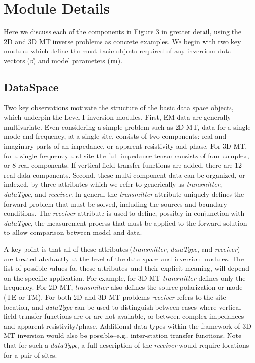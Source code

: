 \section{Module Details}

Here we discuss each of the components in Figure 3 in greater detail,
using the 2D and 3D MT inverse problems as concrete
examples.  We begin with two key modules which
define the most basic objects required of any inversion:
data vectors ($\dd$) and model parameters (${\bf m}$).

\subsection{DataSpace}

Two key observations motivate the structure of the basic
data space objects, which underpin the Level I inversion modules. 
First, EM data are generally multivariate.  
Even considering a simple problem such as 2D MT,
data for a single mode and frequency, at a single site, consists
of two components: real and imaginary parts of an impedance,
or apparent resistivity and phase.  For 3D MT, for a single
frequency and site the full impedance tensor consists of 
four complex, or 8 real  components.  If vertical field transfer
functions are added, there are 12 real data components.
Second, these multi-component data can be organized, or indexed,
by three attributes which we refer to generically
as {\it transmitter}, {\it dataType}, and {\it receiver}.
In general the {\it transmitter} attribute uniquely defines
the forward problem that must be solved, including the sources and
boundary conditions.  The {\it receiver} attribute
is used to define, possibly in conjunction with {\it dataType},
the measurement process that must be applied to the forward
solution to allow comparison between model and data.  

A key point is that all of these attributes 
({\it transmitter}, {\it dataType}, and {\it receiver})
are treated abstractly at the level of the data space and inversion
modules.  The list of possible values for these attributes,
and their explicit meaning, will depend on the specific application.
For example, for 3D MT {\it transmitter} defines only the frequency.
For 2D MT, {\it transmitter} also defines
the source polarization or mode (TE or TM).
For both 2D and 3D MT problems {\it receiver}
refers to the site location, and {\it dataType} can
be used to distinguish between cases where 
vertical field transfer functions are or are not available,
or between complex impedances and apparent resistivity/phase.
Additional data types within the framework of 3D MT 
inversion would also be possible--e.g., inter-station transfer
functions.  Note that for such a {\em dataType},
a full description of the 
{\it receiver} would require locations for a pair of sites.

